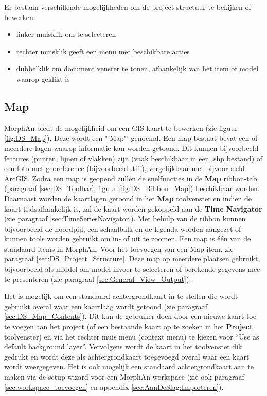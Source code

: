 Er bestaan verschillende mogelijkheden om de project structuur te bekijken of bewerken:
\begin{itemize}
\item linker muisklik om te selecteren
\item rechter muisklik geeft een menu met beschikbare acties
\item dubbelklik om document venster te tonen, afhankelijk van het item of model waarop geklikt is
\end{itemize}

\subsection{Map}
	\label{sec:DS_MapView}
MorphAn biedt de mogelijkheid om een GIS kaart te bewerken (zie figuur \ref{fig:DS_Map}). Deze wordt een "'Map"' genoemd. Een map bestaat bevat een of meerdere lagen waarop informatie kan worden getoond. Dit kunnen bijvoorbeeld features (punten, lijnen of vlakken) zijn (vaak beschikbaar in een .shp bestand) of een foto met georeference (bijvoorbeeld .tiff), vergelijkbaar met bijvoorbeeld ArcGIS. Zodra een map is geopend zullen de snelfuncties in de \textbf{Map} ribbon-tab (paragraaf \ref{sec:DS_Toolbar}, figuur \ref{fig:DS_Ribbon_Map}) beschikbaar worden. Daarnaast worden de kaartlagen getoond in het \textbf{Map} toolvenster en indien de kaart tijdsafhankelijk is, zal de kaart worden gekoppeld aan de \textbf{Time Navigator} (zie paragraaf \ref{sec:TimeSeriesNavigator}). Met behulp van de ribbon kunnen bijvoorbeeld de noordpijl, een schaalbalk en de legenda worden aangezet of kunnen tools worden gebruikt om in- of uit te zoomen. Een map is \'e\'en van de standaard items in MorphAn. Voor het toevoegen van een Map item, zie paragraaf \ref{sec:DS_Project_Structure}. Deze map op meerdere plaatsen gebruikt, bijvoorbeeld als middel om model invoer te selecteren of berekende gegevens mee te presenteren (zie paragraaf \ref{sec:General_View_Output}). 


Het is mogelijk om een standaard achtergrondkaart in te stellen die wordt gebruikt overal waar een kaartlaag wordt getoond (zie paragraaf \ref{sec:DS_Map_Contents}). Dit kan de gebruiker doen door een nieuwe kaart toe te voegen aan het project (of een bestaande kaart op te zoeken in het \textbf{Project} toolvenster) en via het rechter muis menu (context menu) te kiezen voor "`Use as default background layer"'. Vervolgens wordt de kaart in het toolvenster dik gedrukt en wordt deze als achtergrondkaart toegevoegd overal waar een kaart wordt weergegeven. Het is ook mogelijk een standaard achtergrondkaart aan te maken via de setup wizard voor een MorphAn workspace (zie ook paragraaf \ref{sec:workspace_toevoegen} en appendix \ref{sec:AanDeSlag:Importeren}).

